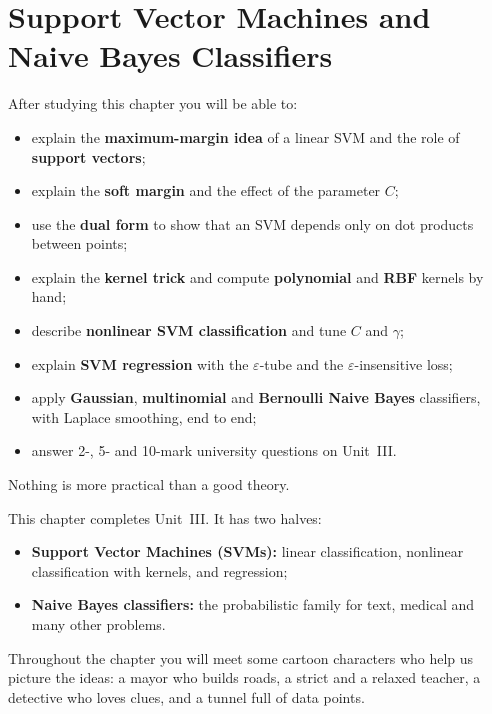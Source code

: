 \chapter{Support Vector Machines and Naive Bayes Classifiers}
\label{ch:svm}
\begin{objectives}
After studying this chapter you will be able to:
\begin{itemize}
  \item explain the \textbf{maximum-margin idea} of a linear SVM and the role of \textbf{support vectors};
  \item explain the \textbf{soft margin} and the effect of the parameter $C$;
  \item use the \textbf{dual form} to show that an SVM depends only on dot products between points;
  \item explain the \textbf{kernel trick} and compute \textbf{polynomial} and \textbf{RBF} kernels by hand;
  \item describe \textbf{nonlinear SVM classification} and tune $C$ and $\gamma$;
  \item explain \textbf{SVM regression} with the $\varepsilon$-tube and the $\varepsilon$-insensitive loss;
  \item apply \textbf{Gaussian}, \textbf{multinomial} and \textbf{Bernoulli Naive Bayes} classifiers, with Laplace smoothing, end to end;
  \item answer 2-, 5- and 10-mark university questions on Unit~III.
\end{itemize}
\end{objectives}

\begin{pullquote}
Nothing is more practical than a good theory.
\end{pullquote}

This chapter completes Unit~III. It has two halves:

\begin{itemize}
  \item \textbf{Support Vector Machines (SVMs):} linear classification, nonlinear classification with kernels, and regression;
  \item \textbf{Naive Bayes classifiers:} the probabilistic family for text, medical and many other problems.
\end{itemize}

Throughout the chapter you will meet some cartoon characters who help us picture the ideas: a mayor who builds roads, a strict and a relaxed teacher, a detective who loves clues, and a tunnel full of data points.

